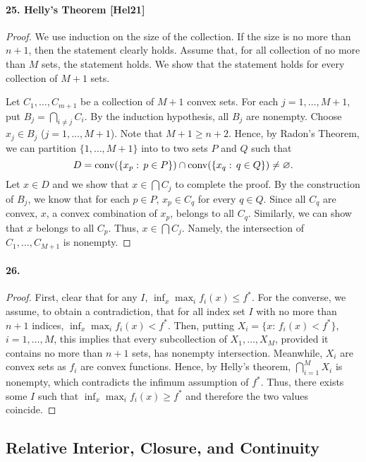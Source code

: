   \paragraph{25. Helly's Theorem [Hel21]}
  \begin{proof}
    We use induction on the size of the collection. If the size is no more
    than $n+1$, then the statement clearly holds. Assume that, for all 
    collection of no more than $M$ sets, the statement holds. We show that the 
    statement holds for every collection of $M+1$ sets.\par
    Let $C_1,\dots,C_{m+1}$ be a collection of $M+1$ convex sets. For each $j=
    1,\dots,M+1$, put $B_j=\bigcap_{i\ne j}C_i$. By the induction hypothesis,
    all $B_j$ are nonempty. Choose $x_j\in B_j$ ($j=1,\dots,M+1$). Note that 
    $M+1\ge n+2$. Hence, by Radon's Theorem, we can partition $\{1,\dots,M+1\}$
    into to two sets $P$ and $Q$ such that
    \[
      D=\operatorname{conv}(\{x_p:\, p\in P\})\cap\operatorname{conv}(\{x_q:\, q\in Q\})\ne\varnothing.
    \]
    Let $x\in D$ and we show that $x\in\bigcap C_j$ to complete the proof. By
    the construction of $B_j$, we know that for each $p\in P$, $x_p\in C_q$ for
    every $q\in Q$. Since all $C_q$ are convex, $x$, a convex combination of 
    $x_p$, belongs to all $C_q$. Similarly, we can show that $x$ belongs to all 
    $C_p$. Thus, $x\in\bigcap C_j$. Namely, the intersection of $C_1,\dots,
    C_{M+1}$ is nonempty.
  \end{proof}
  
  \paragraph{26.}
  \begin{proof}
    First, clear that for any $I$, $\inf_x\max_i f_i(x)\le f^*$. For the 
    converse, we assume, to obtain a contradiction, that for all index set $I$
    with no more than $n+1$ indices, $\inf_x\max_i f_i(x)<f^*$. Then, putting
    $X_i=\{x:\, f_i(x)<f^*\}$, $i=1,\dots,M$, this implies that every 
    subcollection of $X_1,\dots,X_M$, provided it contains no more than $n+1$
    sets, has nonempty intersection. Meanwhile, $X_i$ are convex sets as $f_i$
    are convex functions. Hence, by Helly's theorem, $\bigcap_{i=1}^MX_i$ is
    nonempty, which contradicts the infimum assumption of $f^*$. Thus, there 
    exists some $I$ such that $\inf_x\max_i f_i(x)\ge f^*$ and therefore the
    two values coincide.
  \end{proof}
\subsection{Relative Interior, Closure, and Continuity}
